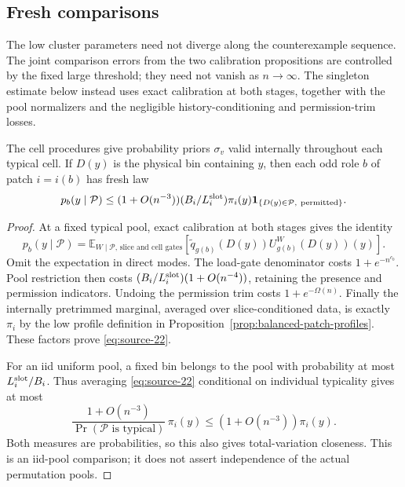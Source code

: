 \subsection{Fresh comparisons}
\label{sec:fresh-comparisons}

\begin{remark}\label{rem:low-fixed-scale}
The low cluster parameters need not diverge along the counterexample
sequence. The joint comparison errors from the two calibration
propositions are controlled by the fixed large threshold; they need not
vanish as \(n\to\infty\). The singleton estimate below instead uses
exact calibration at both stages, together with the pool normalizers and
the negligible history-conditioning and permission-trim losses.
\end{remark}

\begin{lemma}\label{lem:fresh-singleton}
The cell procedures give probability priors \(\sigma_v\) valid internally
throughout each typical cell. If \(D(y)\) is the physical bin containing
\(y\), then each odd role \(b\) of patch \(i=i(b)\) has fresh law
\begin{equation}
 p_b(y\mid\mathcal P)\le (1+O(n^{-3}))
       (B_i/L_i^{\rm slot})\pi_i(y)
       \mathbf1_{\{D(y)\in\mathcal P,\ {\rm permitted}\}}.          \label{eq:source-22}
\end{equation}
\end{lemma}

\begin{proof}
At a fixed typical pool, exact calibration at both stages gives the
identity
\[
 p_b(y\mid\mathcal P)=
 \mathbb E_{W\mid\mathcal P,\,\text{slice and cell gates}}
       [\widetilde q_{g(b)}(D(y))U_{g(b)}^W(D(y))(y)].
\]
Omit the expectation in direct modes. The load-gate denominator costs
\(1+e^{-n^{c_0}}\). Pool restriction then costs
\((B_i/L_i^{\rm slot})(1+O(n^{-4}))\), retaining the presence and
permission indicators. Undoing the permission trim costs
\(1+e^{-\Omega(n)}\). Finally the internally pretrimmed marginal,
averaged over slice-conditioned data, is exactly \(\pi_i\) by the low
profile definition in Proposition~\ref{prop:balanced-patch-profiles}.
These factors prove \eqref{eq:source-22}.

For an iid uniform pool, a fixed bin belongs to the pool with probability
at most \(L_i^{\rm slot}/B_i\). Thus averaging
\eqref{eq:source-22} conditional on individual typicality gives at most
\[
 \frac{1+O(n^{-3})}{\Pr(\mathcal P\text{ is typical})}\,\pi_i(y)
       \le(1+O(n^{-3}))\pi_i(y).
\]
Both measures are probabilities, so this also gives total-variation
closeness. This is an iid-pool comparison; it does not assert independence
of the actual permutation pools.
\end{proof}

